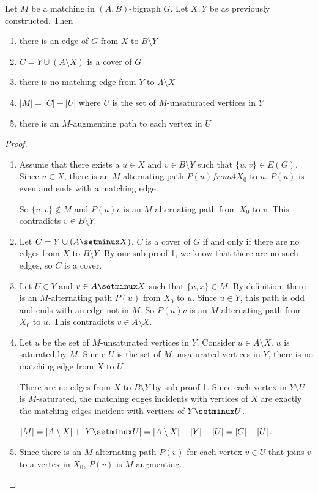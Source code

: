 \documentclass[12pt]{article}
\begin{document}
\begin{lemma}
Let $M$ be a matching in $(A,B)$-bigraph $G$. Let $X,Y$ be as previously constructed. Then
\begin{enumerate}
\item there is an edge of $G$ from $X$ to $B\setminus Y$
\item $C = Y\cup (A\setminus X)$ is a cover of $G$
\item there is no matching edge from $Y$ to $A\setminus X$
\item $|M| = |C| - |U|$ where $U$ is the set of $M$-unsaturated vertices in $Y$
\item there is an $M$-augmenting path to each vertex in $U$
\end{enumerate}
\end{lemma}

\begin{proof}
\begin{enumerate}
\item Assume that there exists a $u\in X$ and $v\in B\setminus Y$ such that $\{u,v\}\in E(G)$. Since $u\in X$, there is an $M$-alternating path $P(u) from 4X_0$ to $u$. $P(u)$ is even and ends with a matching edge.

So $\{u,v\}\notin M$ and $P(u)v$ is an $M$-alternating path from $X_0$ to $v$. This contradicts $v\in B\setminus Y$.
\item Let $C = Y \cup (A \setminux X)$. $C$ is a cover of $G$ if and only if there are no edges from $X$ to $B\setminus Y$. By our sub-proof 1, we know that there are no such edges, so $C$ is a cover.
\item Let $U\in Y$ and $v\in A\setminux X$ such that $\{u,x\}\in M$. By definition, there is an $M$-alternating path $P(u)$ from $X_0$ to $u$. Since $u\in Y$, this path is odd and ends with an edge not in $M$. So $P(u)v$ is an $M$-alternating path from $X_0$ to $u$. This contradicts $v\in A\setminus X$.
\item Let $u$ be the set of $M$-unsaturated vertices in $Y$. Consider $u\in A\setminus X$. $u$ is saturated by $M$. Sinc e $U$ is the set of $M$-unsaturated vertices in $Y$, there is no matching edge from $X$ to $U$.

There are no edges from $X$ to $B\setminus Y$ by sub-proof 1. Since each vertex in $Y\setminus U$ is $M$-saturated, the matching edges incidents with vertices of $X$ are exactly the matching edges incident with vertices of $Y\setminux U$.

$|M| = |A\setminus X| + |Y\setminux U| = |A\setminus X| + |Y| - |U| = |C| - |U|$.
\item Since there is an $M$-alternating path $P(v)$ for each vertex $v\in U$ that joins $v$ to a vertex in $X_0$, $P(v)$ is $M$-augmenting.
\end{enumerate}
\end{proof}
\end{document}
